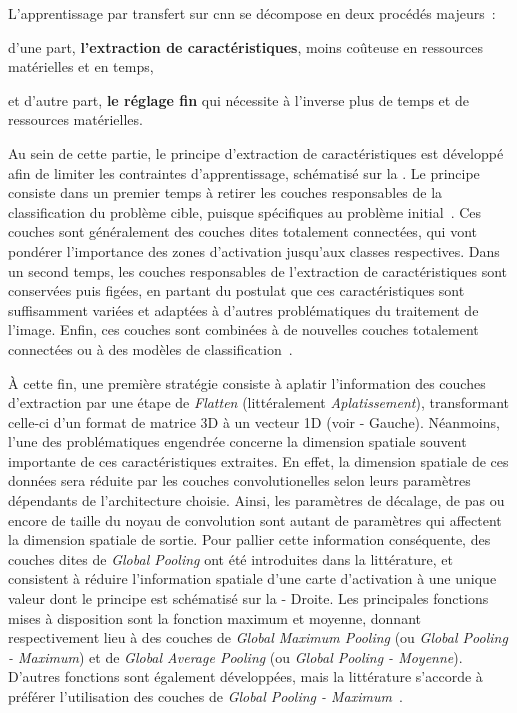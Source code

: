 L'apprentissage par transfert sur \gls{cnn} se décompose en deux procédés majeurs~:~
\begin{inlinerate}
    \item d'une part, \textbf{l'extraction de caractéristiques}, moins coûteuse en ressources matérielles et en temps,
    \item et d'autre part, \textbf{le réglage fin} qui nécessite à l'inverse plus de temps et de ressources matérielles. 
\end{inlinerate}
Au sein de cette partie, le principe d'extraction de caractéristiques est développé afin de limiter les contraintes d'apprentissage, schématisé sur la . Le principe consiste dans un premier temps à retirer les couches responsables de la classification du problème cible, puisque spécifiques au problème initial~\cite{Huh2016, Deepak2019}. Ces couches sont généralement des couches dites totalement connectées, qui vont pondérer l'importance des zones d'activation jusqu'aux classes respectives. Dans un second temps, les couches responsables de l'extraction de caractéristiques sont conservées puis figées, en partant du postulat que ces caractéristiques sont suffisamment variées et adaptées à d'autres problématiques du traitement de l'image. Enfin, ces couches sont combinées à de nouvelles couches totalement connectées ou à des modèles de classification~\cite{Litjens2017}.\par 

À cette fin, une première stratégie consiste à aplatir l'information des couches d'extraction par une étape de \textit{Flatten} (littéralement \textit{Aplatissement}), transformant celle-ci d'un format de matrice 3D à un vecteur 1D (voir  - Gauche). Néanmoins, l'une des problématiques engendrée concerne la dimension spatiale souvent importante de ces caractéristiques extraites. En effet, la dimension spatiale de ces données sera réduite par les couches convolutionelles selon leurs paramètres dépendants de l'architecture choisie. Ainsi, les paramètres de décalage, de pas ou encore de taille du noyau de convolution sont autant de paramètres qui affectent la dimension spatiale de sortie. Pour pallier cette information conséquente, des couches dites de \textit{Global Pooling} ont été introduites dans la littérature, et consistent à réduire l'information spatiale d'une carte d'activation à une unique valeur dont le principe est schématisé sur la  - Droite. Les principales fonctions mises à disposition sont la fonction maximum et moyenne, donnant respectivement lieu à des couches de \textit{Global Maximum Pooling} (ou \textit{Global Pooling - Maximum}) et de \textit{Global Average Pooling} (ou \textit{Global Pooling - Moyenne}). D'autres fonctions sont également développées, mais la littérature s'accorde à préférer l'utilisation des couches de \textit{Global Pooling - Maximum}~\cite{christlein2019}.\par

